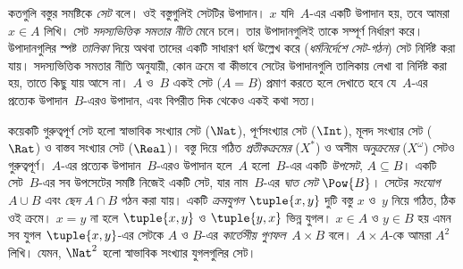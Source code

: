কতগুলি বস্তুর সমষ্টিকে \emph{সেট} বলে। ওই বস্তুগুলিই সেটটির
উপাদান। $x$ যদি~$A$-এর একটি উপাদান হয়, তবে আমরা $x \in A$ লিখি।
সেট \emph{সদস্যভিত্তিক সমতার নীতি} মেনে চলে। তার উপাদানগুলিই তাকে
সম্পূর্ণ নির্ধারণ করে। উপাদানগুলির স্পষ্ট \emph{তালিকা} দিয়ে অথবা
তাদের একটি সাধারণ ধর্ম উল্লেখ করে (\emph{ধর্মনির্দেশে সেট-গঠন}) সেট
নির্দিষ্ট করা যায়। সদস্যভিত্তিক সমতার নীতি অনুযায়ী, কোন ক্রমে বা
কীভাবে সেটের উপাদানগুলি তালিকায় লেখা বা নির্দিষ্ট করা হয়, তাতে কিছু
যায় আসে না। $A$ ও~$B$ একই সেট ($A = B$) প্রমাণ করতে হলে দেখাতে হবে
যে~$A$-এর প্রত্যেক উপাদান~$B$-এরও উপাদান, এবং বিপরীত দিক থেকেও একই
কথা সত্য।

কয়েকটি গুরুত্বপূর্ণ সেট হলো স্বাভাবিক সংখ্যার সেট ($\Nat$),
পূর্ণসংখ্যার সেট ($\Int$), মূলদ সংখ্যার সেট ($\Rat$) ও বাস্তব
সংখ্যার সেট ($\Real$)। বস্তু দিয়ে গঠিত \emph{প্রতীকক্রমের} ($X^*$)
ও অসীম \emph{অনুক্রমের} ($X^\omega$) সেটও গুরুত্বপূর্ণ। $A$-এর প্রত্যেক উপাদান~$B$-এরও
উপাদান হলে~$A$ হলো~$B$-এর একটি \emph{উপসেট}, $A \subseteq B$।
একটি সেট~$B$-এর সব উপসেটের সমষ্টি নিজেই একটি সেট, যার নাম~$B$-এর
\emph{ঘাত সেট} $\Pow{B}$। সেটের \emph{সংযোগ} $A \cup B$ এবং
\emph{ছেদ} $A \cap B$ গঠন করা যায়। একটি \emph{ক্রমযুগল}
$\tuple{x, y}$ দুটি বস্তু $x$ ও~$y$ নিয়ে গঠিত, ঠিক ওই ক্রমে।
$x = y$ না হলে $\tuple{x, y}$ ও $\tuple{y, x}$ ভিন্ন যুগল।
$x \in A$ ও $y \in B$ হয় এমন সব যুগল $\tuple{x, y}$-এর সেটকে
$A$ ও $B$-এর \emph{কার্তেসীয় গুণফল}~$A \times B$ বলে।
$A \times A$-কে আমরা $A^2$ লিখি। যেমন, $\Nat^2$ হলো স্বাভাবিক
সংখ্যার যুগলগুলির সেট।
